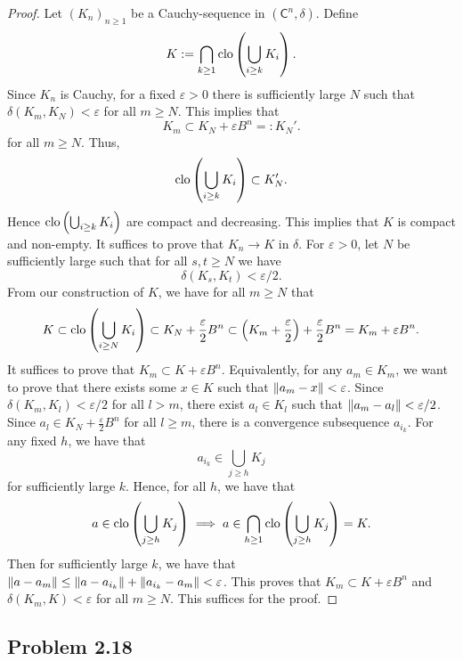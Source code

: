 \documentclass[12pt]{article}
\begin{document}
\begin{proof}
	Let $(K_n)_{n \geq 1}$ be a Cauchy-sequence in $(\mathsf{C}^n, \delta)$. Define
	\[
		K := \bigcap_{k \geq 1} \operatorname{clo} \left ( \bigcup_{i \geq k} K_i \right ).
	\]
	Since $K_n$ is Cauchy, for a fixed $\varepsilon > 0$ there is sufficiently large $N$ such that $\delta(K_m, K_N) < \varepsilon$ for all $m \geq N$. This implies that 
	\[
		K_m \subset K_N + \varepsilon B^n =: K_N'.
	\]
	for all $m \geq N$. Thus, 
	\[	
		\operatorname{clo} \left ( \bigcup_{i \geq k} K_i \right ) \subset K_N'.
	\]
	Hence $\operatorname{clo} \left ( \bigcup_{i \geq k} K_i \right )$ are compact and decreasing. This implies that $K$ is compact and non-empty. It suffices to prove that $K_n \to K$ in $\delta$. For $\varepsilon > 0$, let $N$ be sufficiently large such that for all $s, t \geq N$ we have 
	\[
		\delta(K_s, K_t) < \varepsilon/2. 
	\]
	From our construction of $K$, we have for all $m \geq N$ that 
	\[
		K \subset \operatorname{clo} \left ( \bigcup_{i \geq N} K_i \right ) \subset K_N + \frac{\varepsilon}{2} B^n \subset \left ( K_m + \frac{\varepsilon}{2} \right ) + \frac{\varepsilon}{2} B^n = K_m + \varepsilon B^n.
	\]
	It suffices to prove that $K_m \subset K + \varepsilon B^n$. Equivalently, for any $a_m \in K_m$, we want to prove that there exists some $x \in K$ such that $\left\lVert a_m - x\right\rVert < \varepsilon$. Since $\delta(K_m, K_l) < \varepsilon / 2$ for all $l > m$, there exist $a_l \in K_l$ such that $\left\lVert a_m - a_l\right\rVert < \varepsilon / 2$. Since $a_l \in K_N + \frac{\varepsilon}{2} B^n$ for all $l \geq m$, there is a convergence subsequence $a_{i_k}$. For any fixed $h$, we have that 
	\[
		a_{i_k} \in \bigcup_{j \geq h} K_j
	\]
	for sufficiently large $k$. Hence, for all $h$, we have that 
	\[
		a \in \operatorname{clo} \left ( \bigcup_{j \geq h} K_j \right ) \implies a \in \bigcap_{h \geq 1} \operatorname{clo} \left ( \bigcup_{j \geq h} K_j \right ) = K. 
	\]
	Then for sufficiently large $k$, we have that $\left\lVert a - a_m\right\rVert \leq \left\lVert a - a_{i_k}\right\rVert + \left\lVert a_{i_k} - a_m\right\rVert < \varepsilon$. This proves that $K_m \subset K + \varepsilon B^n$ and $\delta (K_m, K) < \varepsilon$ for all $m \geq N$. This suffices for the proof.
\end{proof}
\newpage 

\subsection{Problem 2.18}
\end{document}
